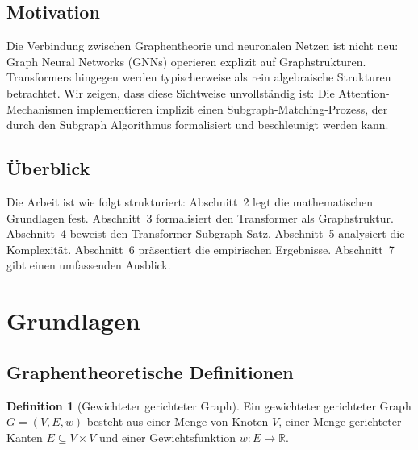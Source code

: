 ﻿\documentclass[a4paper,12pt]{article}
\theoremstyle{definition}
\newtheorem{definition}{Definition}
\begin{document}
\subsection{Motivation}

Die Verbindung zwischen Graphentheorie und neuronalen Netzen ist nicht neu:
Graph Neural Networks (GNNs) \cite{scarselli2009graph} operieren explizit auf Graphstrukturen.
Transformers hingegen werden typischerweise als rein algebraische Strukturen betrachtet.
Wir zeigen, dass diese Sichtweise unvollständig ist: Die Attention-Mechanismen
implementieren implizit einen Subgraph-Matching-Prozess, der durch den Subgraph
Algorithmus formalisiert und beschleunigt werden kann.

\subsection{Überblick}

Die Arbeit ist wie folgt strukturiert: Abschnitt~2 legt die mathematischen Grundlagen
fest. Abschnitt~3 formalisiert den Transformer als Graphstruktur. Abschnitt~4
beweist den Transformer-Subgraph-Satz. Abschnitt~5 analysiert die Komplexität.
Abschnitt~6 präsentiert die empirischen Ergebnisse. Abschnitt~7 gibt einen
umfassenden Ausblick.

\section{Grundlagen}

\subsection{Graphentheoretische Definitionen}

\begin{definition}[Gewichteter gerichteter Graph]
	Ein gewichteter gerichteter Graph $G = (V, E, w)$ besteht aus einer Menge
	von Knoten $V$, einer Menge gerichteter Kanten $E \subseteq V \times V$
	und einer Gewichtsfunktion $w: E \to \mathbb{R}$.
\end{definition}
\end{document}
